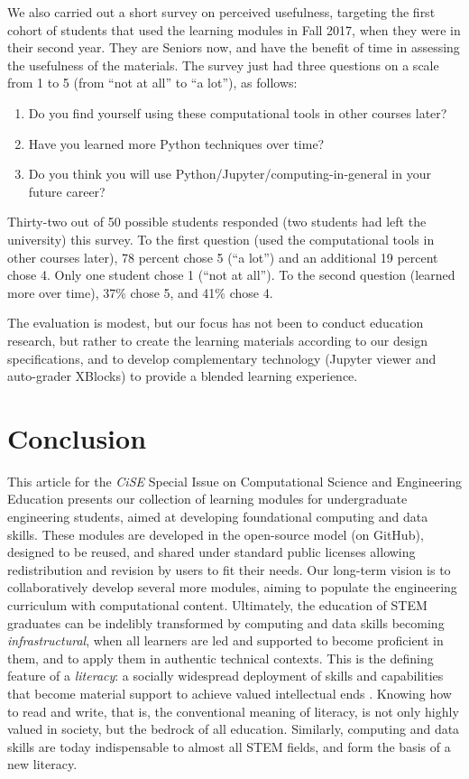 \documentclass[10pt,journal,compsoc]{IEEEtran}
\begin{document}
We also carried out a short survey on perceived usefulness, targeting the first cohort of students that used the learning modules in Fall 2017, when they were in their second year. 
They are Seniors now, and have the benefit of time in assessing the usefulness of the materials.  
The survey just had three questions on a scale from 1 to 5 (from ``not at all'' to ``a lot''), as follows:
\begin{enumerate}
\item Do you find yourself using these computational tools in other courses later? 
\item Have you learned more Python techniques over time?
\item Do you think you will use Python/Jupyter/computing-in-general in your future career?
\end{enumerate}
\noindent Thirty-two out of 50 possible students responded (two students had left the university) this survey. 
To the first question (used the computational tools in other courses later), 78 percent chose 5 (``a lot'') and an additional 19 percent chose 4.
Only one student chose 1 (``not at all''). 
To the second question (learned more over time), 37\% chose 5, and 41\% chose 4.

The evaluation is modest, but our focus has not been to conduct education research, but rather to create the learning materials according to our design specifications, and to develop complementary technology (Jupyter viewer and auto-grader XBlocks) to provide a blended learning experience.

\section{Conclusion}

This article for the \emph{CiSE} Special Issue on Computational Science and Engineering Education presents our collection of learning modules for undergraduate engineering students, aimed at developing foundational computing and data skills. 
These modules are developed in the open-source model (on GitHub), designed to be reused, and shared under standard public licenses allowing redistribution and revision by users to fit their needs. 
Our long-term vision is to collaboratively develop several more modules, aiming to populate the engineering curriculum with computational content. 
Ultimately, the education of STEM graduates can be indelibly transformed by computing and data skills becoming \emph{infrastructural}, when all learners are led and supported to become proficient in them, and to apply them in authentic technical contexts. 
This is the defining feature of a \emph{literacy}: a socially widespread deployment of skills and capabilities that become material support to achieve valued intellectual ends \cite{disessa2001}.
Knowing how to read and write, that is, the conventional meaning of literacy, is not only highly valued in society, but the bedrock of all education. 
Similarly, computing and data skills are today indispensable to almost all STEM fields, and form the basis of a new literacy.
\end{document}
